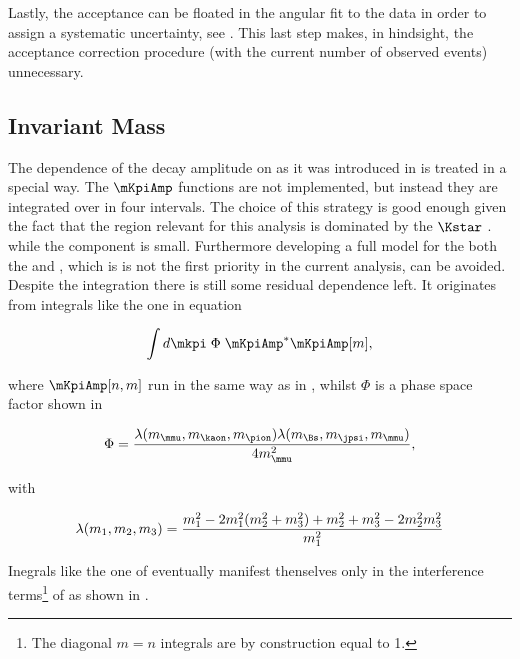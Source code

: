 Lastly, the acceptance can be floated in the angular fit to the data in order to assign a systematic uncertainty, see .
This last step makes, in hindsight, the acceptance correction procedure (with the current number of observed events) unnecessary.


\subsection{\Kpi Invariant Mass}
\label{Kpi_Invariant_mass}

The dependence of the \BJpsiKpi decay amplitude on \mkpi as it was introduced in  is treated in a special way.
The $\mKpiAmp$ functions are not implemented, but instead they are integrated over in four intervals. The choice of this strategy
is good enough given the fact that the \mkpi region relevant for this analysis is dominated by the $\Kstar$ \pwave.
while the \swave component is small. Furthermore developing a full model for the both the \pwave and \swave, which is is not the
first priority in the current analysis, can be avoided. Despite the \mkpi integration there is still some residual dependence left.
It originates from integrals like the one in equation 

\begin{equation}
  \label{spIntegrals}
  \int d\mkpi \; \Phi \; \mKpiAmp^* \mKpiAmp[m],
\end{equation}

\noindent where $\mKpiAmp[n,m]$ run in the same way as in , whilst $\Phi$ is a phase space
factor shown in 

\begin{equation}
  \centering
  \Phi = \frac{\lambda(m_\mmu,m_\kaon,m_\pion) \lambda(m_{\Bs},m_\jpsi,m_\mmu)}{ 4 m_\mmu^2},
  \label{csp_ph_sp_factor}
\end{equation}

\noindent with

\begin{equation}
  \centering
  \lambda(m_1,m_2,m_3) = \frac{m_1^2 - 2m_1^2(m_2^2 + m_3^2) + m_2^2 + m_3^2 - 2m_2^2m_3^2 } {m_1^2} \nonumber
  \label{csp_ph_sp_factor_def}
\end{equation}

Inegrals like the one of  eventually manifest thenselves only in the \spwave interference
terms\footnote{The diagonal $m=n$ integrals are by construction equal to 1.} of  as shown in .

